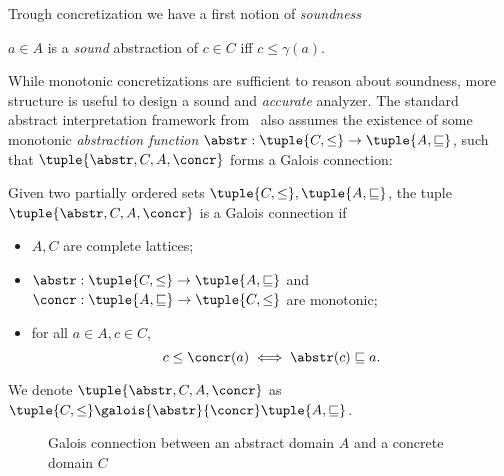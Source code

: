 Trough concretization we have a first notion of \emph{soundness}

\begin{definition}[Soundness]\label{def:soundness}
  \(a \in A\) is a \emph{sound} abstraction of \(c\in C\) iff
  \(c \leq \gamma(a)\).
\end{definition}

While monotonic concretizations are sufficient to reason about
soundness, more structure is useful to design a sound and
\emph{accurate} analyzer. The standard abstract interpretation
framework from~\cite{patrickradhia:one} also assumes the existence of
some monotonic \emph{abstraction function}
\({\abstr : \tuple{C, \leq} \to \tuple{A, \sqsubseteq}}\), such that
\(\tuple{\abstr, C, A, \concr}\) forms a Galois connection:

\begin{definition}\label{def:galoiscon}
  Given two partially ordered sets
  \(\tuple{C, \leq}, \tuple{A, \sqsubseteq}\), the tuple
  \(\tuple{\abstr, C, A, \concr}\) is a Galois connection if
  \begin{itemize}
  \item \(A,C\) are complete lattices;
  \item \(\abstr : \tuple{C, \leq} \to \tuple{A, \sqsubseteq}\) and
    \(\concr : \tuple{A, \sqsubseteq} \to \tuple{C, \leq}\) are monotonic;
  \item for all \(a\in A, c\in C\),
    \begin{equation}\label{eq:conn}
      c \leq \concr(a) \iff \abstr(c) \sqsubseteq a.
    \end{equation}
  \end{itemize}

  We denote \(\tuple{\abstr, C, A, \concr}\) as
  \({\tuple{C, \leq} \galois{\abstr}{\concr} \tuple{A, \sqsubseteq}}\).
\end{definition}

\begin{figure}
  \centering
  \usetikzlibrary{arrows.meta}
  \caption{Galois connection between an abstract domain \(A\) and a
    concrete domain \(C\)}\label{fig:galois}
\end{figure}

